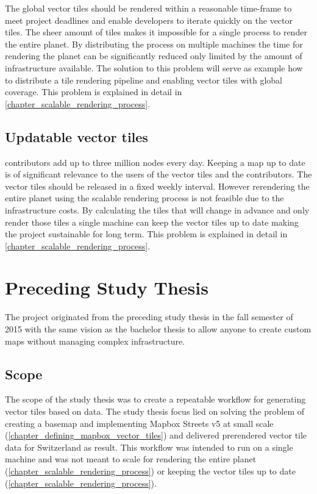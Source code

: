 The global vector tiles should be rendered within a reasonable time-frame
to meet project deadlines and enable developers to iterate quickly on the vector tiles.
The sheer amount of tiles makes it impossible for a single process to render the entire planet.
By distributing the process on multiple machines the time for rendering the planet can be significantly reduced only limited
by the amount of infrastructure available. The solution to this problem will serve as example how to distribute a tile rendering pipeline and enabling
vector tiles with global coverage. This problem is explained in detail in \autoref{chapter_scalable_rendering_process}.

\subsection{Updatable vector tiles}\label{intro_scalable_rendering_process}

\osm{} contributors add up to three million nodes every day\cite{osm_wiki_2016}. Keeping a map up to date is of significant relevance to the users of the vector tiles and the contributors. The vector tiles should be released in a fixed weekly interval.
However rerendering the entire planet using the scalable rendering process is not feasible due to the infrastructure costs. By calculating the tiles that will change in advance and only render those tiles a single machine can keep the vector tiles up to date making the project sustainable for long term. This problem is explained in detail in \autoref{chapter_scalable_rendering_process}.

\section{Preceding Study Thesis}\label{part1_scope_of_study_thesis}

The \osmvt{} project originated from the preceding study thesis in the fall semester of 2015 with the same vision as the bachelor thesis to allow anyone to create custom \osm{} maps without managing complex infrastructure. 

\subsection*{Scope}\label{part1_scope}

The scope of the study thesis was to create a repeatable workflow for generating vector tiles based on \osm{} data. The study thesis focus lied on solving the problem of creating a basemap and implementing Mapbox Streets v5 at small scale (\autoref{chapter_defining_mapbox_vector_tiles}) and delivered prerendered vector tile data for Switzerland as result.
This workflow was intended to run on a single machine and was not meant to scale for rendering the entire planet (\autoref{chapter_scalable_rendering_process}) or keeping the vector tiles up to date (\autoref{chapter_scalable_rendering_process}).


